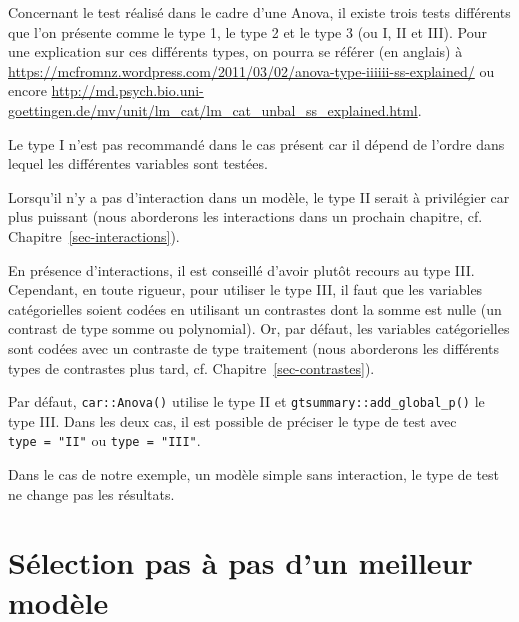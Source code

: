 \documentclass[
  letterpaper,
  DIV=11,
  numbers=noendperiod,
  oneside]{scrreprt}
\begin{document}
\begin{tcolorbox}[enhanced jigsaw, colbacktitle=quarto-callout-note-color!10!white, opacityback=0, toprule=.15mm, colback=white, coltitle=black, bottomtitle=1mm, toptitle=1mm, titlerule=0mm, rightrule=.15mm, title=\textcolor{quarto-callout-note-color}{\faInfo}\hspace{0.5em}{Note}, breakable, bottomrule=.15mm, opacitybacktitle=0.6, arc=.35mm, left=2mm, leftrule=.75mm, colframe=quarto-callout-note-color-frame]

Concernant le test réalisé dans le cadre d'une Anova, il existe trois
tests différents que l'on présente comme le type 1, le type 2 et le type
3 (ou I, II et III). Pour une explication sur ces différents types, on
pourra se référer (en anglais) à
\url{https://mcfromnz.wordpress.com/2011/03/02/anova-type-iiiiii-ss-explained/}
ou encore
\url{http://md.psych.bio.uni-goettingen.de/mv/unit/lm_cat/lm_cat_unbal_ss_explained.html}.

Le type I n'est pas recommandé dans le cas présent car il dépend de
l'ordre dans lequel les différentes variables sont testées.

Lorsqu'il n'y a pas d'interaction dans un modèle, le type II serait à
privilégier car plus puissant (nous aborderons les interactions dans un
prochain chapitre, cf. Chapitre~\ref{sec-interactions}).

En présence d'interactions, il est conseillé d'avoir plutôt recours au
type III. Cependant, en toute rigueur, pour utiliser le type III, il
faut que les variables catégorielles soient codées en utilisant un
contrastes dont la somme est nulle (un contrast de type somme ou
polynomial). Or, par défaut, les variables catégorielles sont codées
avec un contraste de type traitement (nous aborderons les différents
types de contrastes plus tard, cf. Chapitre~\ref{sec-contrastes}).

Par défaut, \texttt{car::Anova()} utilise le type II et
\texttt{gtsummary::add\_global\_p()} le type III. Dans les deux cas, il
est possible de préciser le type de test avec \texttt{type\ =\ "II"} ou
\texttt{type\ =\ "III"}.

Dans le cas de notre exemple, un modèle simple sans interaction, le type
de test ne change pas les résultats.

\end{tcolorbox}

\hypertarget{sec-step}{%
\section{Sélection pas à pas d'un meilleur modèle}\label{sec-step}}
\end{document}
